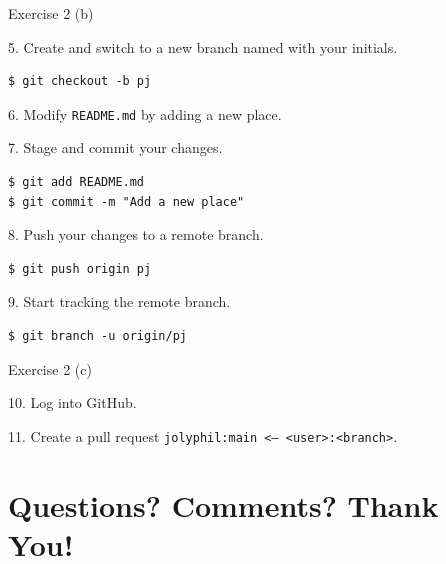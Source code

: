 \documentclass[handout]{beamer}
\begin{document}
\begin{frame}[fragile]{Exercise 2 (b)}

5. Create and switch to a new branch named with your initials. 

\begin{lstlisting}
$ git checkout -b pj
\end{lstlisting}

6. Modify \texttt{README.md} by adding a new place.

\vspace{0.3cm}

7. Stage and commit your changes.
\begin{lstlisting}
$ git add README.md
$ git commit -m "Add a new place" 
\end{lstlisting}

8. Push your changes to a remote branch.
\begin{lstlisting}
$ git push origin pj
\end{lstlisting}

9. Start tracking the remote branch.
\begin{lstlisting}
$ git branch -u origin/pj
\end{lstlisting}

\end{frame}


\begin{frame}{Exercise 2 (c)}

10. Log into GitHub.

\vspace{0.3cm}

11. Create a pull request \texttt{jolyphil:main <-- <user>:<branch>}.

\end{frame}

\section{Questions? Comments? Thank You!}
\end{document}
